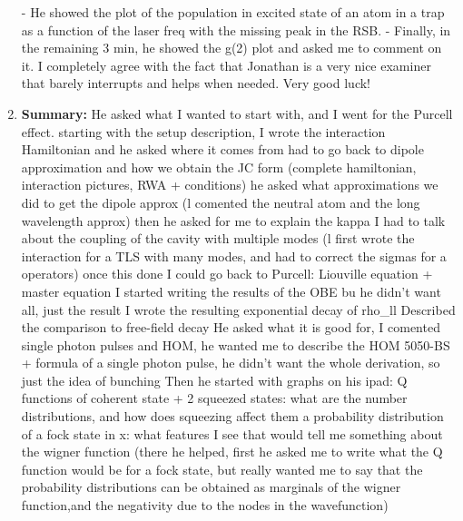 \documentclass{article}%
\begin{document}
\begin{enumerate}
\begin{mycolorbox}
{-} He showed the plot of the population in excited state of an atom in a trap as a function of the laser freq with the missing peak in the RSB.\newline%
{-} Finally, in the remaining 3 min, he showed the g(2) plot and asked me to comment on it.\newline%
I completely agree with the fact that Jonathan is a very nice examiner that barely interrupts and helps when needed. Very good luck!%
\end{mycolorbox}%
\item%
\textbf{Summary:}%
\newline%
He asked what I wanted to start with, and I went for the Purcell effect. starting with the setup description, I wrote the interaction Hamiltonian and he asked where it comes from\newline%
had to go back to dipole approximation and how we obtain the JC form (complete hamiltonian, interaction pictures, RWA + conditions)\newline%
he asked what approximations we did to get the dipole approx (l comented the neutral atom and the long wavelength approx)\newline%
then he asked for me to explain the kappa\newline%
I had to talk about the coupling of the cavity with multiple modes (l first wrote the interaction for a TLS with many modes, and had to correct the sigmas for a operators)\newline%
once this done I could go back to Purcell:\newline%
Liouville equation + master equation\newline%
I started writing the results of the OBE bu he didn't want all, just the result\newline%
I wrote the resulting exponential decay of rho\_ll\newline%
Described the comparison to free{-}field decay\newline%
He asked what it is good for, I comented single photon pulses and HOM, he wanted me to describe the HOM 5050{-}BS + formula of a single photon pulse, he didn't want the whole derivation, so just the idea of bunching\newline%
Then he started with graphs on his ipad:\newline%
Q functions of coherent state + 2 squeezed states: what are the number distributions, and how does squeezing affect them a probability distribution of a fock state in x: what features I see that would tell me something about the wigner function (there he helped, first he asked me to write what the Q function would be for a fock state, but really wanted me to say that the probability distributions can be obtained as marginals of the wigner function,and the negativity due to the nodes in the wavefunction)\newline%

\end{enumerate}
\end{document}
